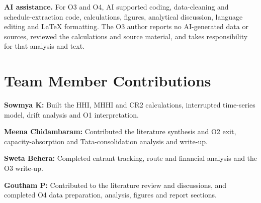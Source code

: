 \documentclass[12pt,a4paper]{article}
\newcommand{\templatebullet}[1]{\par\noindent\textbullet\hspace{5.88pt}#1\par}
\begin{document}
\textbf{AI assistance.} For O3 and O4, AI supported coding, data-cleaning and schedule-extraction code, calculations, figures, analytical discussion, language editing and LaTeX formatting. The O3 author reports no AI-generated data or sources, reviewed the calculations and source material, and takes responsibility for that analysis and text.

\section*{Team Member Contributions}
\templatebullet{\textcolor{authorSowmya}{\textbf{Sowmya K:} Built the HHI, MHHI and CR2 calculations, interrupted time-series model, drift analysis and O1 interpretation.}}
\templatebullet{\textcolor{authorMeena}{\textbf{Meena Chidambaram:} Contributed the literature synthesis and O2 exit, capacity-absorption and Tata-consolidation analysis and write-up.}}
\templatebullet{\textcolor{authorSweta}{\textbf{Sweta Behera:} Completed entrant tracking, route and financial analysis and the O3 write-up.}}
\templatebullet{\textcolor{authorGoutham}{\textbf{Goutham P:} Contributed to the literature review and discussions, and completed O4 data preparation, analysis, figures and report sections.}}
\end{document}
